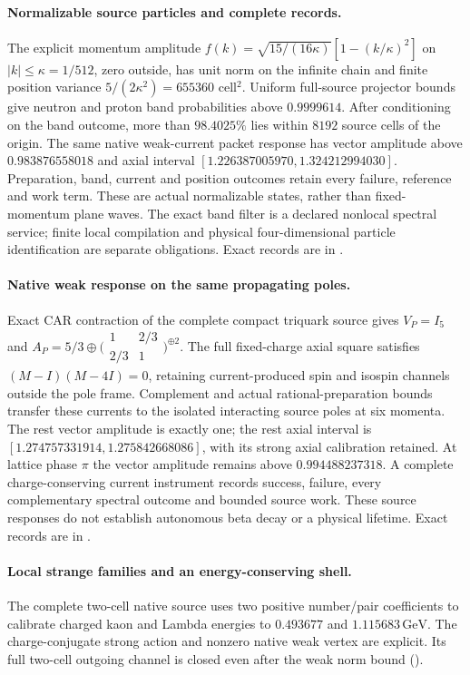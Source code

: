 \paragraph{Normalizable source particles and complete records.}
The explicit momentum amplitude
$f(k)=\sqrt{15/(16\kappa)}[1-(k/\kappa)^2]$ on $|k|\leq\kappa=1/512$,
zero outside, has unit norm on the infinite chain and finite position
variance $5/(2\kappa^2)=655360$ cell$^2$. Uniform full-source projector
bounds give neutron and proton band probabilities above $0.9999614$.
After conditioning on the band outcome, more than $98.4025\%$ lies within
$8192$ source cells of the origin. The same native weak-current packet
response has vector amplitude above $0.983876558018$ and axial interval
$[1.226387005970,1.324212994030]$. Preparation, band, current and position
outcomes retain every failure, reference and work term. These are actual
normalizable states, rather than fixed-momentum plane waves. The exact
band filter is a declared nonlocal spectral service; finite local
compilation and physical four-dimensional particle identification are
separate obligations. Exact records are in
.

\paragraph{Native weak response on the same propagating poles.}
Exact CAR contraction of the complete compact triquark source gives
$V_P=I_5$ and
$A_P=5/3\oplus\bigl(\begin{smallmatrix}1&2/3\\2/3&1\end{smallmatrix}\bigr)^{\oplus2}$.
The full fixed-charge axial square satisfies $(M-I)(M-4I)=0$, retaining
current-produced spin and isospin channels outside the pole frame.
Complement and actual rational-preparation bounds transfer these currents
to the isolated interacting source poles at six momenta. The rest vector
amplitude is exactly one; the rest axial interval is
$[1.274757331914,1.275842668086]$, with its strong axial calibration
retained. At lattice phase $\pi$ the vector amplitude remains above
$0.994488237318$. A complete charge-conserving current instrument records
success, failure, every complementary spectral outcome and bounded source
work. These source responses do not establish autonomous beta decay or a
physical lifetime. Exact records are in
.

\paragraph{Local strange families and an energy-conserving shell.}
The complete two-cell native source uses two positive number/pair coefficients
to calibrate charged kaon and Lambda energies to $0.493677$ and
$1.115683\,\mathrm{GeV}$. The charge-conjugate strong action and nonzero
native weak vertex are explicit. Its full two-cell outgoing channel is
closed even after the weak norm bound ().

